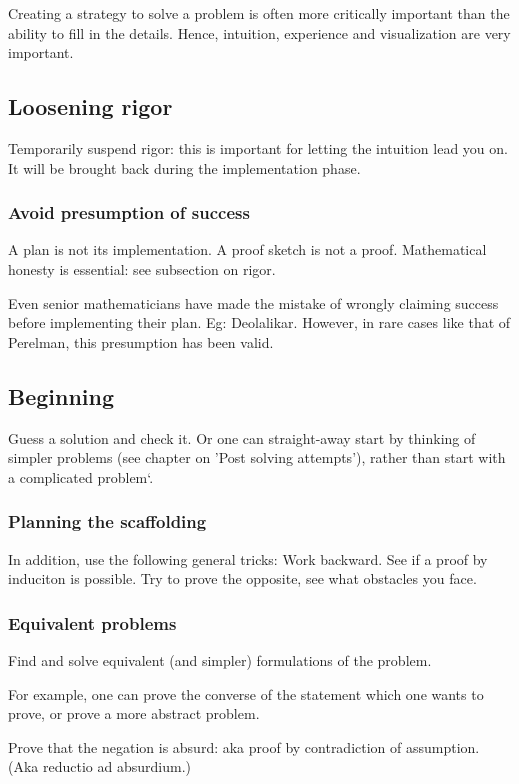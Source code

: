\documentclass[oneside, article]{memoir}
\begin{document}
Creating a strategy to solve a problem is often more critically important than the ability to fill in the details. Hence, intuition, experience and visualization are very important.

\subsection{Loosening rigor}
Temporarily suspend rigor: this is important for letting the intuition lead you on. It will be brought back during the implementation phase.

\subsubsection{Avoid presumption of success}
A plan is not its implementation. A proof sketch is not a proof. Mathematical honesty is essential: see subsection on rigor.

Even senior mathematicians have made the mistake of wrongly claiming success before implementing their plan. Eg: Deolalikar. However, in rare cases like that of Perelman, this presumption has been valid.

\subsection{Beginning}
Guess a solution and check it. Or one can straight-away start by thinking of simpler problems (see chapter on 'Post solving attempts'), rather than start with a complicated problem`.

\subsubsection{Planning the scaffolding}
In addition, use the following general tricks:
\subitem Work backward.
\subitem See if a proof by induciton is possible.
\subitem Try to prove the opposite, see what obstacles you face.

\subsubsection{Equivalent problems}
Find and solve equivalent (and simpler) formulations of the problem.

For example, one can prove the converse of the statement which one wants to prove, or prove a more abstract problem.

Prove that the negation is absurd: aka proof by contradiction of assumption. (Aka reductio ad absurdium.)
\end{document}
